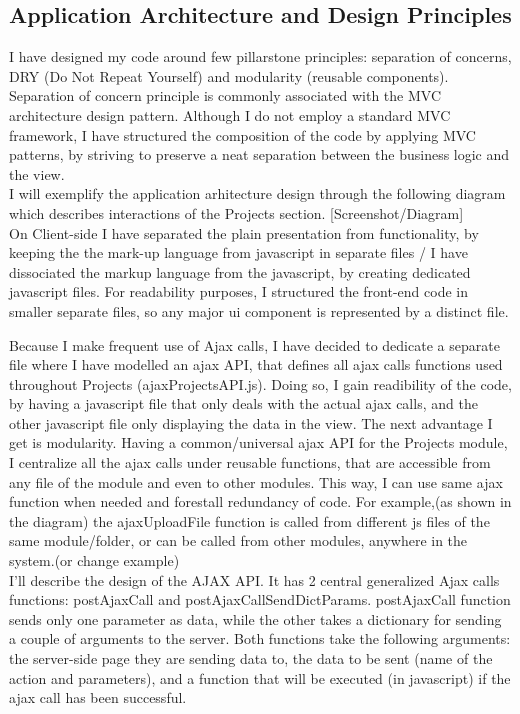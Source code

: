 \subsection{Application Architecture and Design Principles}

I have designed my code around few pillarstone principles: separation of concerns, DRY (Do Not Repeat Yourself) and modularity (reusable components). Separation of concern principle is commonly associated with the MVC architecture design pattern. Although I do not employ a standard MVC framework, I have structured the composition of the code by applying MVC patterns, by striving to preserve a neat separation between the business logic and the view.\\ 

I will exemplify the application arhitecture design through the following diagram which describes interactions of the Projects section. 
[Screenshot/Diagram]\\

On Client-side I have separated the plain presentation from functionality, by keeping the the mark-up language from javascript in separate files / I have dissociated the markup language from the javascript, by creating dedicated javascript files. For readability purposes, I structured the front-end code in smaller separate files, so any major ui component is represented by a distinct file. 

Because I make frequent use of Ajax calls, I have decided to dedicate a separate file where I have modelled an ajax API, that defines all ajax calls functions used throughout Projects (ajaxProjectsAPI.js). Doing so, I gain readibility of the code, by having a javascript file that only deals with the actual ajax calls, and the other javascript file only displaying the data in the view. The next advantage I get is modularity. Having a common/universal ajax API for the Projects module, I centralize all the ajax calls under reusable functions, that are accessible from any file of the module and even to other modules. This way, I can use same ajax function when needed and forestall redundancy of code.
For example,(as shown in the diagram) the ajaxUploadFile function is called from different js files of the same module/folder, or can be called from other modules, anywhere in the system.(or change example)\\ 

I'll describe the design of the AJAX API. It has 2 central generalized Ajax calls functions: postAjaxCall and postAjaxCallSendDictParams. postAjaxCall function sends only one parameter as data, while the other takes a dictionary for sending a couple of arguments to the server.
Both functions take the following arguments: the server-side page they are sending data to, the data to be sent (name of the action and parameters), and a function that will be executed (in javascript) if the ajax call has been successful.\\ 

